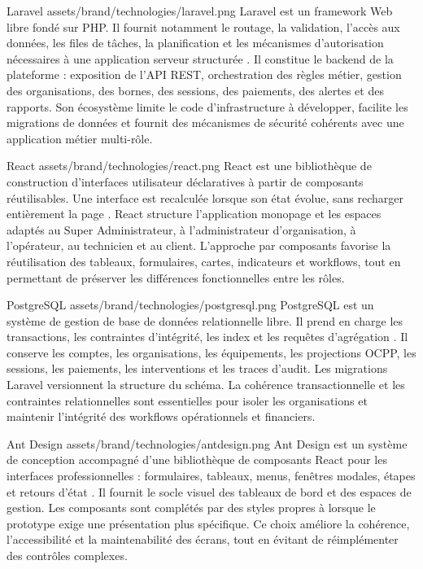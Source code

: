 \TechnologyProfile
  {Laravel}
  {assets/brand/technologies/laravel.png}
  {Laravel est un framework Web libre fondé sur PHP. Il fournit notamment le
  routage, la validation, l'accès aux données, les files de tâches, la
  planification et les mécanismes d'autorisation nécessaires à une application
  serveur structurée \cite{laravel}.}
  {Il constitue le backend de la plateforme : exposition de l'API REST,
  orchestration des règles métier, gestion des organisations, des bornes, des
  sessions, des paiements, des alertes et des rapports.}
  {Son écosystème limite le code d'infrastructure à développer, facilite les
  migrations de données et fournit des mécanismes de sécurité cohérents avec
  une application métier multi-rôle.}

\TechnologyProfile
  {React}
  {assets/brand/technologies/react.png}
  {React est une bibliothèque de construction d'interfaces utilisateur
  déclaratives à partir de composants réutilisables. Une interface est
  recalculée lorsque son état évolue, sans recharger entièrement la page
  \cite{react}.}
  {React structure l'application monopage et les espaces adaptés au Super
  Administrateur, à l'administrateur d'organisation, à l'opérateur, au
  technicien et au client.}
  {L'approche par composants favorise la réutilisation des tableaux, formulaires,
  cartes, indicateurs et workflows, tout en permettant de préserver les
  différences fonctionnelles entre les rôles.}

\TechnologyProfile
  {PostgreSQL}
  {assets/brand/technologies/postgresql.png}
  {PostgreSQL est un système de gestion de base de données relationnelle libre.
  Il prend en charge les transactions, les contraintes d'intégrité, les index
  et les requêtes d'agrégation \cite{postgresql}.}
  {Il conserve les comptes, les organisations, les équipements, les
  projections OCPP, les sessions, les paiements, les interventions et les
  traces d'audit. Les migrations Laravel versionnent la structure du schéma.}
  {La cohérence transactionnelle et les contraintes relationnelles sont
  essentielles pour isoler les organisations et maintenir l'intégrité des
  workflows opérationnels et financiers.}

\TechnologyProfile
  {Ant Design}
  {assets/brand/technologies/antdesign.png}
  {Ant Design est un système de conception accompagné d'une bibliothèque de
  composants React pour les interfaces professionnelles : formulaires,
  tableaux, menus, fenêtres modales, étapes et retours d'état
  \cite{antDesign}.}
  {Il fournit le socle visuel des tableaux de bord et des espaces de gestion.
  Les composants sont complétés par des styles propres à \ProjectName{} lorsque
  le prototype exige une présentation plus spécifique.}
  {Ce choix améliore la cohérence, l'accessibilité et la maintenabilité des
  écrans, tout en évitant de réimplémenter des contrôles complexes.}

